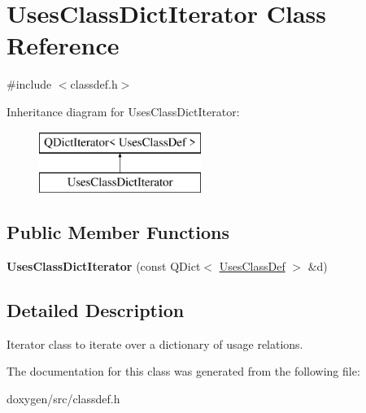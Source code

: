 \hypertarget{class_uses_class_dict_iterator}{}\section{Uses\+Class\+Dict\+Iterator Class Reference}
\label{class_uses_class_dict_iterator}


{\ttfamily \#include $<$classdef.\+h$>$}

Inheritance diagram for Uses\+Class\+Dict\+Iterator\+:\begin{figure}[H]
\begin{center}
\leavevmode
\includegraphics[height=2.000000cm]{class_uses_class_dict_iterator}
\end{center}
\end{figure}
\subsection*{Public Member Functions}
\begin{DoxyCompactItemize}
\item 
\mbox{\label{class_uses_class_dict_iterator_a741911d63a87ad5d522ccea01ccae714}} 
{\bfseries Uses\+Class\+Dict\+Iterator} (const Q\+Dict$<$ \mbox{\hyperlink{struct_uses_class_def}{Uses\+Class\+Def}} $>$ \&d)
\end{DoxyCompactItemize}


\subsection{Detailed Description}
Iterator class to iterate over a dictionary of usage relations. 

The documentation for this class was generated from the following file\+:\begin{DoxyCompactItemize}
\item 
doxygen/src/classdef.\+h\end{DoxyCompactItemize}
